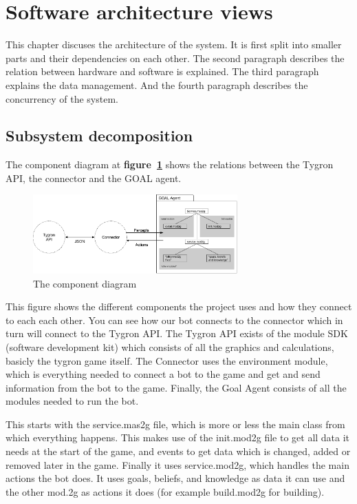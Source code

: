 \label{Software architecture views}
\section{Software architecture views}
This chapter discuses the architecture of the system. It is first split into smaller parts and their dependencies on each other. The second paragraph describes the relation between hardware and software is explained. The third paragraph explains the data management. And the fourth paragraph describes the concurrency of the system.

\subsection{Subsystem decomposition}

The component diagram at \textbf{figure~\ref{fig:comp_diag}} shows the relations between the Tygron API, the connector and the GOAL agent. 

\begin{figure}[h]
	  \centering
	  \includegraphics[width=0.7\textwidth]{system_decomposition}
	  \caption{The component diagram}
	  \label{fig:comp_diag}
\end{figure}
This figure shows the different components the project uses and how they connect to each each other. You can see how our bot connects to the connector which in turn will connect to the Tygron API. The Tygron API exists of the module SDK (software development kit) which consists of all the graphics and calculations, basicly the tygron game itself. The Connector uses the environment module, which is everything needed to connect a bot to the game and get and send information from the bot to the game. Finally, the Goal Agent consists of all the modules needed to run the bot.

This starts with the service.mas2g file, which is more or less the main class from which everything happens. This makes use of the init.mod2g file to get all data it needs at the start of the game, and events to get data which is changed, added or removed later in the game. Finally it uses service.mod2g, which handles the main actions the bot does. It uses goals, beliefs, and knowledge as data it can use and the other mod.2g as actions it does (for example build.mod2g for building).

